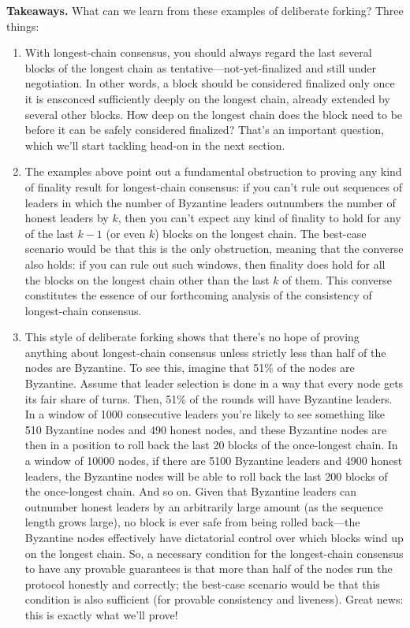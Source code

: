\noindent
\textbf{Takeaways.} What can we learn from these examples of deliberate forking? Three things:
\begin{enumerate}
    \item With longest-chain consensus, you should always regard the last several blocks of
the longest chain as tentative—not-yet-finalized and still under negotiation. In other
words, a block should be considered finalized only once it is ensconced sufficiently
deeply on the longest chain, already extended by several other blocks. How deep
on the longest chain does the block need to be before it can be safely considered finalized? That’s an important question, which we’ll start tackling head-on in the next
section.
    \item The examples above point out a fundamental obstruction to proving any kind of finality
result for longest-chain consensus: if you can’t rule out sequences of leaders in which
the number of Byzantine leaders outnumbers the number of honest leaders by $k$, then
you can’t expect any kind of finality to hold for any of the last $k - 1$ (or even $k$)
blocks on the longest chain. The best-case scenario would be that this is the only
obstruction, meaning that the converse also holds: if you can rule out such windows,
then finality does hold for all the blocks on the longest chain other than the last $k$
of them. This converse constitutes the essence of our forthcoming analysis of the
consistency of longest-chain consensus.
    \item This style of deliberate forking shows that there’s no hope of proving anything about
longest-chain consensus unless strictly less than half of the nodes are Byzantine. To
see this, imagine that 51\% of the nodes are Byzantine. Assume that leader selection is
done in a way that every node gets its fair share of turns. Then, 51\% of the rounds
will have Byzantine leaders. In a window of 1000 consecutive leaders you’re likely to
see something like 510 Byzantine nodes and 490 honest nodes, and these Byzantine
nodes are then in a position to roll back the last 20 blocks of the once-longest chain. In
a window of 10000 nodes, if there are 5100 Byzantine leaders and 4900 honest leaders,
the Byzantine nodes will be able to roll back the last 200 blocks of the once-longest
chain. And so on. Given that Byzantine leaders can outnumber honest leaders by an
arbitrarily large amount (as the sequence length grows large), no block is ever safe
from being rolled back—the Byzantine nodes effectively have dictatorial control over
which blocks wind up on the longest chain.
So, a necessary condition for the longest-chain consensus to have any provable guarantees
is that more than half of the nodes run the protocol honestly and correctly; the best-case scenario would be that this condition is also sufficient (for provable consistency
and liveness). Great news: this is exactly what we’ll prove!
\end{enumerate}

